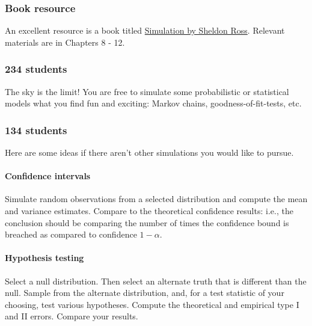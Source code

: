 \documentclass[11pt]{article}
\begin{document}
\hypertarget{book-resource}{%
\subsubsection{Book resource}\label{book-resource}}

An excellent resource is a book titled
\href{https://ucsb-primo.hosted.exlibrisgroup.com/primo-explore/fulldisplay?docid=01UCSB_ALMA51283278820003776\&context=L\&vid=UCSB\&search_scope=default_scope\&isFrbr=true\&tab=default_tab\&lang=en_US}{Simulation
by Sheldon Ross}. Relevant materials are in Chapters 8 - 12.

\hypertarget{students}{%
\subsubsection{234 students}\label{students}}

The sky is the limit! You are free to simulate some probabilistic or
statistical models what you find fun and exciting: Markov chains,
goodness-of-fit-tests, etc.

\hypertarget{students-1}{%
\subsubsection{134 students}\label{students-1}}

Here are some ideas if there aren't other simulations you would like to
pursue.

\hypertarget{confidence-intervals}{%
\paragraph{Confidence intervals}\label{confidence-intervals}}

Simulate random observations from a selected distribution and compute
the mean and variance estimates. Compare to the theoretical confidence
results: i.e., the conclusion should be comparing the number of times
the confidence bound is breached as compared to confidence \(1-\alpha\).

\hypertarget{hypothesis-testing}{%
\paragraph{Hypothesis testing}\label{hypothesis-testing}}

Select a null distribution. Then select an alternate truth that is
different than the null. Sample from the alternate distribution, and,
for a test statistic of your choosing, test various hypotheses. Compute
the theoretical and empirical type I and II errors. Compare your
results.
\end{document}
